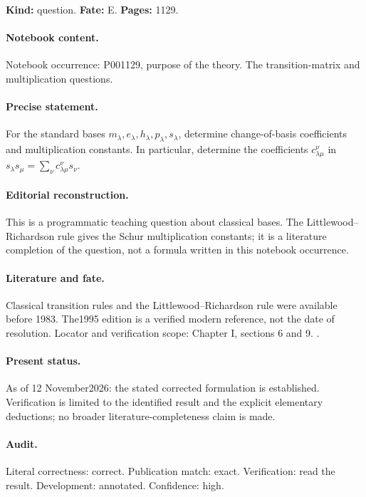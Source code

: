 \noindent\textbf{Kind:} question. \textbf{Fate:} E. \textbf{Pages:} 1129.\par

\paragraph{Notebook content.} Notebook occurrence: P001129, purpose of the theory. The transition-matrix and multiplication questions.

\paragraph{Precise statement.} For the standard bases \(m_\lambda,e_\lambda,h_\lambda,p_\lambda,s_\lambda\), determine change-of-basis coefficients and multiplication constants. In particular, determine the coefficients \(c_{\lambda\mu}^{\nu}\) in \(s_\lambda s_\mu=\sum_\nu c_{\lambda\mu}^{\nu}s_\nu\).

\paragraph{Editorial reconstruction.} This is a programmatic teaching question about classical bases. The Littlewood--Richardson rule gives the Schur multiplication constants; it is a literature completion of the question, not a formula written in this notebook occurrence.

\paragraph{Literature and fate.} Classical transition rules and the Littlewood--Richardson rule were available before 1983. The1995 edition is a verified modern reference, not the date of resolution. Locator and verification scope: Chapter I, sections 6 and 9. \cite{macdonald1995symmetric}.

\paragraph{Present status.} As of 12 November2026: the stated corrected formulation is established. Verification is limited to the identified result and the explicit elementary deductions; no broader literature-completeness claim is made.

\paragraph{Audit.} Literal correctness: correct. Publication match: exact. Verification: read the result. Development: annotated. Confidence: high.


